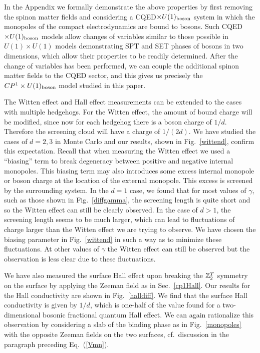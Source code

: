 In the Appendix we formally demonstrate the above properties by first removing the spinon matter fields and considering a CQED$\times U(1)_{\rm boson}$ system in which the monopoles of the compact electrodynamics are bound to bosons. Such CQED$\times U(1)_{\rm boson}$ models allow changes of variables similar to those possible in $U(1)\times U(1)$ models demonstrating SPT and SET phases of bosons in two dimensions\cite{FQHE}, which allow their properties to be readily determined. After the change of variables has been performed, we can couple the additional spinon matter fields to the CQED sector, and this gives us precisely the $CP^1\times U(1)_{\rm boson}$ model studied in this paper.

The Witten effect and Hall effect measurements can be extended to the cases with multiple hedgehogs. For the Witten effect, the amount of bound charge will be modified, since now for each hedgehog there is a boson charge of $1/d$. Therefore the screening cloud will have a charge of $1/(2d)$. We have studied the cases of $d=2, 3$ in Monte Carlo and our results, shown in Fig.~\ref{wittend}, confirm this expectation. Recall that when measuring the Witten effect we used a ``biasing'' term to break degeneracy between positive and negative internal monopoles. This biasing term may also introduces some excess internal monopole or boson charge at the location of the external monopole. This excess is screened by the surrounding system. In the $d=1$ case, we found that for most values of $\gamma$, such as those shown in Fig.~\ref{diffgamma}, the screening length is quite short and so the Witten effect can still be clearly observed. In the case of $d>1$, the screening length seems to be much larger, which can lead to fluctuations of charge larger than the Witten effect we are trying to observe. We have chosen the biasing parameter in Fig.~\ref{wittend} in such a way as to minimize these fluctuations. At other values of $\gamma$ the Witten effect can still be observed but the observation is less clear due to these fluctuations.

We have also measured the surface Hall effect upon breaking the $\mathbb{Z}_2^T$ symmetry on the surface by applying the Zeeman field as in Sec.~\ref{cp1Hall}.
Our results for the Hall conductivity are shown in Fig.~\ref{halldiff}. We find that the surface Hall conductivity is given by $1/d$, which is one-half of the value found for a two-dimensional bosonic fractional quantum Hall effect.\cite{FQHE}  We can again rationalize this observation by considering a slab of the binding phase as in Fig.~\ref{monopoles} with the opposite Zeeman fields on the two surfaces, cf.\ discussion in the paragraph preceding Eq.~(\ref{Vmn}).

